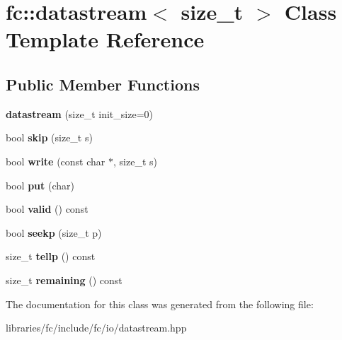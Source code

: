 \hypertarget{classfc_1_1datastream_3_01size__t_01_4}{}\section{fc\+:\+:datastream$<$ size\+\_\+t $>$ Class Template Reference}
\label{classfc_1_1datastream_3_01size__t_01_4}
\subsection*{Public Member Functions}
\begin{DoxyCompactItemize}
\item 
\mbox{\label{classfc_1_1datastream_3_01size__t_01_4_a2a0a18d2b5e9491bbdb7104ce68577ed}} 
{\bfseries datastream} (size\+\_\+t init\+\_\+size=0)
\item 
\mbox{\label{classfc_1_1datastream_3_01size__t_01_4_a44a61e97ed7bc39893445a32ec412857}} 
bool {\bfseries skip} (size\+\_\+t s)
\item 
\mbox{\label{classfc_1_1datastream_3_01size__t_01_4_a484e0eae679c94372a882abcd5b84242}} 
bool {\bfseries write} (const char $\ast$, size\+\_\+t s)
\item 
\mbox{\label{classfc_1_1datastream_3_01size__t_01_4_a4c892ad1ac1a066a06b2f6863c8bd25b}} 
bool {\bfseries put} (char)
\item 
\mbox{\label{classfc_1_1datastream_3_01size__t_01_4_ad390129ab648e1dec14682e31321b19c}} 
bool {\bfseries valid} () const
\item 
\mbox{\label{classfc_1_1datastream_3_01size__t_01_4_ac453b5493ea23797d94a4a4cf96458bc}} 
bool {\bfseries seekp} (size\+\_\+t p)
\item 
\mbox{\label{classfc_1_1datastream_3_01size__t_01_4_aecf66c6b10797d1e4ad62ca3f64048d3}} 
size\+\_\+t {\bfseries tellp} () const
\item 
\mbox{\label{classfc_1_1datastream_3_01size__t_01_4_a79f860423d14ee5caf065337a0e0e9a0}} 
size\+\_\+t {\bfseries remaining} () const
\end{DoxyCompactItemize}


The documentation for this class was generated from the following file\+:\begin{DoxyCompactItemize}
\item 
libraries/fc/include/fc/io/datastream.\+hpp\end{DoxyCompactItemize}
